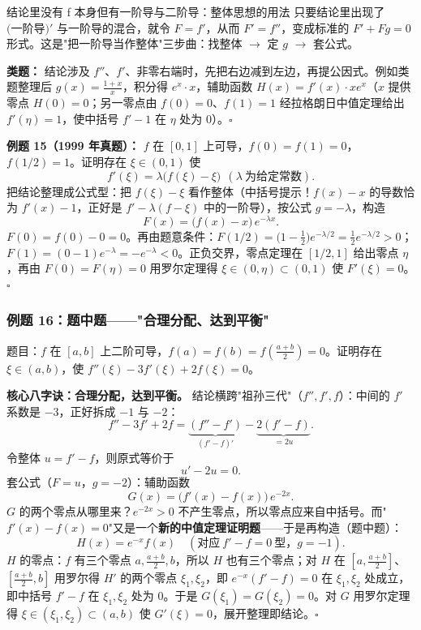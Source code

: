 \documentclass[a4paper]{article}
\begin{document}
\begin{knowledgebox}{结论里没有 f 本身但有一阶导与二阶导：整体思想的用法}
只要结论里出现了 $\big(\text{一阶导}\big)'$ 与一阶导的混合，就令 $F=f'$，从而 $F'=f''$，变成标准的 $F'+Fg=0$ 形式。这是"把一阶导当作整体"三步曲：找整体 $\rightarrow$ 定 $g$ $\rightarrow$ 套公式。
\end{knowledgebox}

\textbf{类题：} 结论涉及 $f''$、$f'$、非零右端时，先把右边减到左边，再提公因式。例如类题整理后 $g(x)=\frac{1+x}{x}$，积分得 $e^{x}\cdot x$，辅助函数 $H(x)=f'(x)\cdot xe^{x}$（$x$ 提供零点 $H(0)=0$；另一零点由 $f(0)=0$、$f(1)=1$ 经拉格朗日中值定理给出 $f'(\eta)=1$，使中括号 $f'-1$ 在 $\eta$ 处为 0）。$\square$

\textbf{例题 15（1999 年真题）：} $f$ 在 $[0,1]$ 上可导，$f(0)=f(1)=0$，$f(1/2)=1$。证明存在 $\xi\in(0,1)$ 使
\[
f'(\xi)=\lambda\big(f(\xi)-\xi\big)\ \ (\lambda\ \text{为给定常数}).
\]
把结论整理成公式型：把 $f(\xi)-\xi$ 看作整体（中括号提示！$f(x)-x$ 的导数恰为 $f'(x)-1$，正好是 $f'-\lambda(f-\xi)$ 中的一阶导），按公式 $g=-\lambda$，构造
\[
F(x)=\big(f(x)-x\big)\,e^{-\lambda x}.
\]
$F(0)=f(0)-0=0$。再由题意条件：$F(1/2)=\big(1-\frac12\big)e^{-\lambda/2}=\frac12 e^{-\lambda/2}>0$；$F(1)=(0-1)e^{-\lambda}=-e^{-\lambda}<0$。正负交界，零点定理在 $[1/2,1]$ 给出零点 $\eta$，再由 $F(0)=F(\eta)=0$ 用罗尔定理得 $\xi\in(0,\eta)\subset(0,1)$ 使 $F'(\xi)=0$。$\square$

\subsubsection{例题 16：题中题——"合理分配、达到平衡"}

题目：$f$ 在 $[a,b]$ 上二阶可导，$f(a)=f(b)=f(\frac{a+b}{2})=0$。证明存在 $\xi\in(a,b)$，使 $f''(\xi)-3f'(\xi)+2f(\xi)=0$。

\textbf{核心八字诀：合理分配，达到平衡。} 结论横跨"祖孙三代"（$f'',f',f$）：中间的 $f'$ 系数是 $-3$，正好拆成 $-1$ 与 $-2$：
\[
f''-3f'+2f=\underbrace{(f''-f')}_{(f'-f)'}-\underbrace{2(f'-f)}_{=2u}.
\]
令整体 $u=f'-f$，则原式等价于
\[
u'-2u=0 .
\]
套公式（$F=u$，$g=-2$）：辅助函数
\[
G(x)=\big(f'(x)-f(x)\big)\,e^{-2x}.
\]
$G$ 的两个零点从哪里来？$e^{-2x}>0$ 不产生零点，所以零点应来自中括号。而"$f'(x)-f(x)=0$"又是一个\textbf{新的中值定理证明题}——于是再构造（题中题）：
\[
H(x)=e^{-x}f(x)\quad(\text{对应}\ f'-f=0\ \text{型，}g=-1).
\]
$H$ 的零点：$f$ 有三个零点 $a,\frac{a+b}{2},b$，所以 $H$ 也有三个零点；对 $H$ 在 $[a,\frac{a+b}{2}]$、$[\frac{a+b}{2},b]$ 用罗尔得 $H'$ 的两个零点 $\xi_1,\xi_2$，即 $e^{-x}(f'-f)=0$ 在 $\xi_1,\xi_2$ 处成立，即中括号 $f'-f$ 在 $\xi_1,\xi_2$ 处为 0。于是 $G(\xi_1)=G(\xi_2)=0$。对 $G$ 用罗尔定理得 $\xi\in(\xi_1,\xi_2)\subset(a,b)$ 使 $G'(\xi)=0$，展开整理即结论。$\square$
\end{document}
